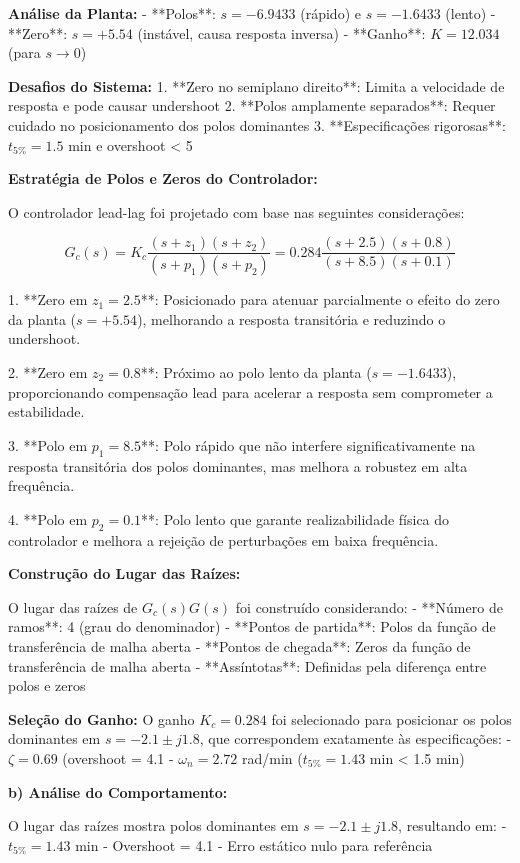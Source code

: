 \documentclass[a4paper,12pt]{article}
\begin{document}
\textbf{Análise da Planta:}
- **Polos**: $s = -6.9433$ (rápido) e $s = -1.6433$ (lento)
- **Zero**: $s = +5.54$ (instável, causa resposta inversa)
- **Ganho**: $K = 12.034$ (para $s \rightarrow 0$)

\textbf{Desafios do Sistema:}
1. **Zero no semiplano direito**: Limita a velocidade de resposta e pode causar undershoot
2. **Polos amplamente separados**: Requer cuidado no posicionamento dos polos dominantes
3. **Especificações rigorosas**: $t_{5\%} = 1.5$ min e overshoot < 5%

\textbf{Estratégia de Polos e Zeros do Controlador:}

O controlador lead-lag foi projetado com base nas seguintes considerações:

$$G_c(s) = K_c \frac{(s + z_1)(s + z_2)}{(s + p_1)(s + p_2)} = 0.284 \frac{(s + 2.5)(s + 0.8)}{(s + 8.5)(s + 0.1)}$$

1. **Zero em $z_1 = 2.5$**: Posicionado para atenuar parcialmente o efeito do zero da planta ($s = +5.54$), melhorando a resposta transitória e reduzindo o undershoot.

2. **Zero em $z_2 = 0.8$**: Próximo ao polo lento da planta ($s = -1.6433$), proporcionando compensação lead para acelerar a resposta sem comprometer a estabilidade.

3. **Polo em $p_1 = 8.5$**: Polo rápido que não interfere significativamente na resposta transitória dos polos dominantes, mas melhora a robustez em alta frequência.

4. **Polo em $p_2 = 0.1$**: Polo lento que garante realizabilidade física do controlador e melhora a rejeição de perturbações em baixa frequência.

\textbf{Construção do Lugar das Raízes:}

O lugar das raízes de $G_c(s)G(s)$ foi construído considerando:
- **Número de ramos**: 4 (grau do denominador)
- **Pontos de partida**: Polos da função de transferência de malha aberta
- **Pontos de chegada**: Zeros da função de transferência de malha aberta
- **Assíntotas**: Definidas pela diferença entre polos e zeros

\textbf{Seleção do Ganho:}
O ganho $K_c = 0.284$ foi selecionado para posicionar os polos dominantes em $s = -2.1 \pm j1.8$, que correspondem exatamente às especificações:
- $\zeta = 0.69$ (overshoot = 4.1%
- $\omega_n = 2.72$ rad/min ($t_{5\%} = 1.43$ min < 1.5 min)

\textbf{b) Análise do Comportamento:}

O lugar das raízes mostra polos dominantes em $s = -2.1 \pm j1.8$, resultando em:
- $t_{5\%} = 1.43$ min
- Overshoot = 4.1%
- Erro estático nulo para referência
\end{document}
